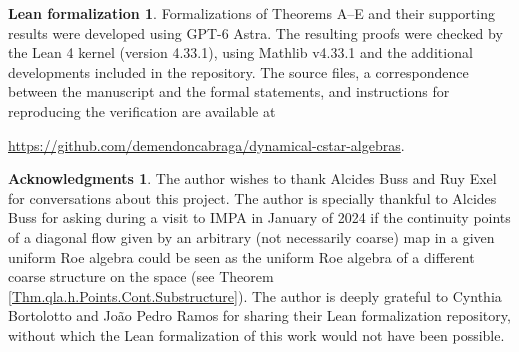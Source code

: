 \documentclass[11pt]{amsart}
\numberwithin{equation}{section}
\theoremstyle{definition}
\newtheorem*{acknowledgments}{Acknowledgments}
\newtheorem*{leanformalization}{Lean formalization}
\theoremstyle{remark}
\begin{document}
\begin{leanformalization}
Formalizations of Theorems A--E and their supporting results
were developed using GPT-6 Astra. The resulting proofs were
checked by the Lean 4 kernel (version 4.33.1), using Mathlib
v4.33.1 and the additional developments included in the repository.
The source files, a correspondence between the manuscript
and the formal statements, and instructions for reproducing
the verification are available at
\begin{center}
\url{https://github.com/demendoncabraga/dynamical-cstar-algebras}.
\end{center}
\end{leanformalization}

\begin{acknowledgments}
    The author wishes to thank Alcides Buss and Ruy Exel for conversations about this project. The author is specially thankful to Alcides Buss for asking  during a visit to IMPA in January of 2024 if the continuity points of a diagonal flow given by an arbitrary (not necessarily coarse) map in a given uniform Roe algebra could be seen as the uniform Roe algebra of a different coarse structure on the space (see Theorem  \ref{Thm.qla.h.Points.Cont.Substructure}).  The author is deeply grateful to Cynthia Bortolotto and João Pedro Ramos for sharing their Lean formalization repository, without which the Lean formalization of  this work would not have been possible.
\end{acknowledgments}
\end{document}
